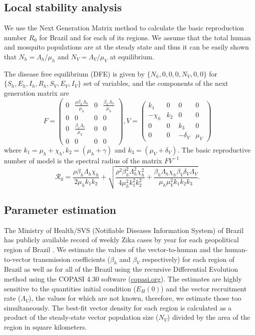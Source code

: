\documentclass[10pt,letterpaper]{article}
\begin{document}
\subsection*{Local stability analysis}
We use the Next Generation Matrix method to calculate the basic reproduction number $R_0$ for Brazil and for each of its regions. We assume that the total human and mosquito populations are at the steady state and thus it can be easily shown that $N_h = \Lambda_h/\mu_h$ and $N_V = \Lambda_V/\mu_V$ at equilibrium.

The disease free equilibrium (DFE) is given by $\{N_h,0,0,0,N_V,0,0\}$ for $\{S_h, E_h, I_h, R_h, S_V, E_V, I_V\}$ set of variables, and the components of the next generation matrix are
$$
F=\left(\begin{array}{cccc}
0 & \frac{\rho \beta_{h} \Lambda_{h}}{\mu_{h}} & 0 & \frac{\beta_{h} \Lambda_{h}}{\mu_{h}} \\
0 & 0 & 0 & 0 \\
0 & \frac{\beta_{v} \Lambda_{v}}{\mu_{V}} & 0 & 0 \\
0 & 0 & 0 & 0
\end{array}\right), V=\left(\begin{array}{cccc}
k_{1} & 0 & 0 & 0 \\
-\chi_{h} & k_{2} & 0 & 0 \\
0 & 0 & k_{3} & 0 \\
0 & 0 & -\delta_{V} & \mu_{V}
\end{array}\right)
$$
where $k_{1}=\mu_{h}+\chi_{h}, k_{2}=\left(\mu_{h}+\gamma\right)$ and $k_{3}=\left(\mu_{V}+\delta_{V}\right)$. The basic reproductive number of model is the spectral radius of the matrix $FV^{-1}$
$$\mathcal{R}_{0}=\frac{\rho \beta_{h} \Lambda_{h} \chi_{h}}{2 \mu_{h} k_{1} k_{2}}+\sqrt{\frac{\rho^{2} \beta_{h}^{2} \Lambda_{h}^{2} \chi_{h}^{2}}{4 \mu_{h}^{2} k_{1}^{2} k_{2}^{2}}+\frac{\beta_{h} \Lambda_{h} \chi_{h} \beta_{V} \delta_{V} \Lambda_{V}}{\mu_{h} \mu_{V}^{2} k_{1} k_{2} k_{3}}}.$$



\subsection*{Parameter estimation}
The  Ministry of Health/SVS (Notifiable Diseases Information System) of Brazil has publicly available record of weekly Zika cases by year for each geopolitical region of Brazil \cite{data}.
We estimate the values of the vector-to-human and the human-to-vector transmission coefficients ($\beta_h$ and $\beta_V$ respectively) for each region of Brazil as well as for all of the Brazil using the recursive Differential Evolution method using the COPASI 4.30 software (\url{copasi.org}). The estimates are highly sensitive to the quantities initial condition ($E_H(0)$) and the vector recruitment rate ($\Lambda_V$), the values for which are not known, therefore, we estimate those too simultaneously. The best-fit vector density for each region is calculated as a product of the steady-state vector population size ($N_V$)  divided by the area of the region in square kilometers.  
\end{document}
